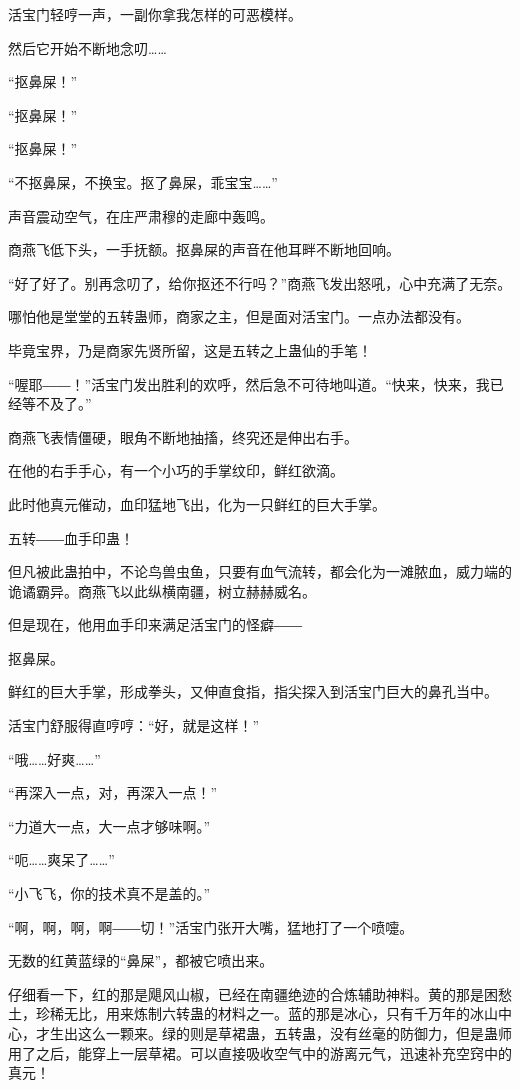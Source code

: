 \begin{this_body}
活宝门轻哼一声，一副你拿我怎样的可恶模样。

然后它开始不断地念叨……

“抠鼻屎！”

“抠鼻屎！”

“抠鼻屎！”

“不抠鼻屎，不换宝。抠了鼻屎，乖宝宝……”

声音震动空气，在庄严肃穆的走廊中轰鸣。

商燕飞低下头，一手抚额。抠鼻屎的声音在他耳畔不断地回响。

“好了好了。别再念叨了，给你抠还不行吗？”商燕飞发出怒吼，心中充满了无奈。

哪怕他是堂堂的五转蛊师，商家之主，但是面对活宝门。一点办法都没有。

毕竟宝界，乃是商家先贤所留，这是五转之上蛊仙的手笔！

“喔耶――！”活宝门发出胜利的欢呼，然后急不可待地叫道。“快来，快来，我已经等不及了。”

商燕飞表情僵硬，眼角不断地抽搐，终究还是伸出右手。

在他的右手手心，有一个小巧的手掌纹印，鲜红欲滴。

此时他真元催动，血印猛地飞出，化为一只鲜红的巨大手掌。

五转――血手印蛊！

但凡被此蛊拍中，不论鸟兽虫鱼，只要有血气流转，都会化为一滩脓血，威力端的诡谲霸异。商燕飞以此纵横南疆，树立赫赫威名。

但是现在，他用血手印来满足活宝门的怪癖――

抠鼻屎。

鲜红的巨大手掌，形成拳头，又伸直食指，指尖探入到活宝门巨大的鼻孔当中。

活宝门舒服得直哼哼：“好，就是这样！”

“哦……好爽……”

“再深入一点，对，再深入一点！”

“力道大一点，大一点才够味啊。”

“呃……爽呆了……”

“小飞飞，你的技术真不是盖的。”

“啊，啊，啊，啊――切！”活宝门张开大嘴，猛地打了一个喷嚏。

无数的红黄蓝绿的“鼻屎”，都被它喷出来。

仔细看一下，红的那是飓风山椒，已经在南疆绝迹的合炼辅助神料。黄的那是困愁土，珍稀无比，用来炼制六转蛊的材料之一。蓝的那是冰心，只有千万年的冰山中心，才生出这么一颗来。绿的则是草裙蛊，五转蛊，没有丝毫的防御力，但是蛊师用了之后，能穿上一层草裙。可以直接吸收空气中的游离元气，迅速补充空窍中的真元！


\end{this_body}
